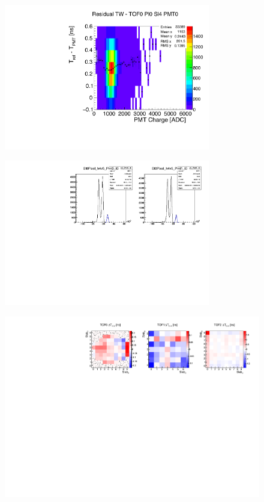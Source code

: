 \begin{figure}
  \begin{center}
  \includegraphics[width=9cm]{03_residual_tw_example} \\
  \caption{}
  \label{fig:ResTW}
  \end{center}
\end{figure}



\begin{figure}
  \begin{center}
  \includegraphics[clip,trim=0 0cm 10cm 0, width=9cm]{04_tof_t0_example} \\
  \caption{}
  \label{fig:tofT0}
  \end{center}
\end{figure}


\begin{figure}
  \begin{center}
  \includegraphics[width=15cm]{05_slab_dt_offset_by_pixel_2d} \\
  \caption{}
  \label{fig:SlabDToffsetByPixel}
  \end{center}
\end{figure}


